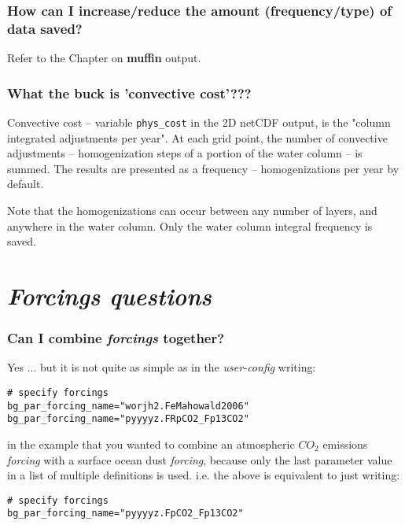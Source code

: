 \documentclass[11pt,fleqn]{book} %
\begin{document}
\subsubsection{How can I increase/reduce the amount (frequency/type) of data saved?}

Refer to the Chapter on \textbf{muffin} output.

%
\subsubsection{What the buck is 'convective cost'???}

Convective cost -- variable \texttt{phys\_cost} in the 2D netCDF output, is the "column integrated adjustments per year". At each grid point, the number of convective adjustments -- homogenization steps of a portion of the water column -- is summed. The results are presented as a frequency -- homogenizations per year by default.

Note that the homogenizations can occur between any number of layers, and anywhere in the water column. Only the water column integral frequency is saved.


\newpage


\section{\textit{Forcings questions}}

%
\subsubsection{Can I combine \textit{forcings} together?}

Yes ... but it is not quite as simple as in the \textit{user-config} writing:
\small\begin{verbatim}
# specify forcings
bg_par_forcing_name="worjh2.FeMahowald2006"
bg_par_forcing_name="pyyyyz.FRpCO2_Fp13CO2"
\end{verbatim}\normalsize
in the example that you wanted to combine an atmospheric \(CO_{2}\) emissions \textit{forcing} with a surface ocean dust \textit{forcing}, because only the last parameter value in a list of multiple definitions is used. i.e. the above is equivalent to just writing:
\small\begin{verbatim}
# specify forcings
bg_par_forcing_name="pyyyyz.FpCO2_Fp13CO2"
\end{verbatim}\normalsize
\end{document}
